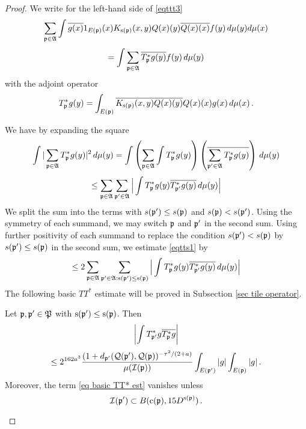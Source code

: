 \begin{proof}

 We write for the left-hand side of \eqref{eqttt3}
\begin{equation}
  \sum_{\mathfrak p \in \mathfrak{A}}\int \overline{g(x)} 1_{E(\mathfrak p)}(x)
  {K_{\mathrm{s}(\mathfrak p)}(x,y)}{{Q}(x)(y)}
    \overline{{Q}(x)(x)}
   f(y)\, d\mu (y)d\mu(x)
\end{equation}
\begin{equation}
  =\int \sum_{\mathfrak p \in \mathfrak{A}} \overline{T_{\mathfrak p} ^*g(y)}   f(y)\, d\mu(y)
\end{equation}
with the adjoint operator
\begin{equation}\label{eq tstarwritten}
    T_{\mathfrak p}^*g(y)=\int_{E(\mathfrak p)} \overline{K_{\mathrm{s}(\mathfrak p)}(x,y)}\overline{{Q}(x)(y)}
    {Q}(x)(x)g(x)\, d\mu(x)\, .
\end{equation}





 We have by expanding the square
      \begin{equation}
 \int |\sum_{\mathfrak p\in \mathfrak{A}}T^*_{\mathfrak p}g(y)|^2\, d\mu(y)=
 \int \left(\sum_{\mathfrak p\in \mathfrak{A}}\int T^*_{\mathfrak p}g(y)\right)
 \left(\overline{\sum_{\mathfrak p'\in \mathfrak{A}}T^*_{\mathfrak p}g(y)}\right)\, d\mu(y)
 \end{equation}\label{eqtts1}
 \begin{equation}
 \le \sum_{\mathfrak p\in \mathfrak{A}} \sum_{\mathfrak p'\in \mathfrak{A}}
  \Big|\int T^*_{\mathfrak p}g(y)\overline{T^*_{\mathfrak p'}g(y)}\, d\mu(y)\Big|
         \end{equation}
We split the sum into the terms with $s(\mathfrak p')\le s(\mathfrak p)$
and $s(\mathfrak p)< s(\mathfrak p')$. Using the symmetry of each summand,
we may switch $\mathfrak p$ and $\mathfrak p'$ in the second sum. Using further positivity
of each summand to replace the condition $s(\mathfrak p')< s(\mathfrak p)$
by $s(\mathfrak p')\le  s(\mathfrak p)$ in the second sum, we estimate \eqref{eqtts1} by
\begin{equation}\label{eqtts2}
 \le2 \sum_{\mathfrak p\in \mathfrak{A}} \sum_{\mathfrak p'\in \mathfrak{A}: \mathrm{s}(\mathfrak p')\le \mathrm{s}(\mathfrak p)}
  \Big|\int T^*_{\mathfrak p}g(y)\overline{T^*_{\mathfrak p'}g(y)}\, d\mu(y)\Big|
         \end{equation}
The following basic $TT^*$ estimate will be proved in Subsection \ref{sec tile operator}.
\begin{lemma}
\label{lem basic TT*}
Let $\mathfrak p, \mathfrak p'\in \mathfrak P$ with
$\mathrm{s}({\mathfrak p'})\leq \mathrm{s}({\mathfrak p})$.
Then
\begin{equation}
    \label{eq basic TT* est}
    \left|\int T^*_{\mathfrak p'}g\overline{T^*_{\mathfrak p}g}\right|
    \end{equation}
\begin{equation}
    \le 2^{162a^3}\frac{(1+d_{\mathfrak p'}(\mathcal{Q}(\mathfrak p'), \mathcal{Q}(\mathfrak p))^{-\tau^2/(2+a)}}{\mu(\mathcal{I}(\mathfrak p))}\int_{E(\mathfrak p')}|g|\int_{E(\mathfrak p)}|g|\,.
\end{equation}
Moreover, the term   \eqref{eq basic TT* est} vanishes unless
\begin{equation}
    \mathcal{I}(\mathfrak p') \subset B(\mathrm{c}(\mathfrak p), 15D^{\mathrm{s}(\mathfrak p)})\, .
\end{equation}
\end{lemma}






\end{proof}
